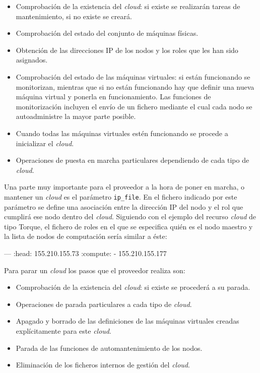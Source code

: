 \begin{itemize}
\item Comprobación de la existencia del \emph{cloud}: si existe se realizarán tareas de mantenimiento, si no existe se creará.
\item Comprobación del estado del conjunto de máquinas físicas.
\item Obtención de las direcciones IP de los nodos y los roles que les han sido asignados.
\item Comprobación del estado de las máquinas virtuales: si están funcionando se monitorizan, mientras que si no están funcionando hay que definir una nueva máquina virtual y ponerla en funcionamiento. Las funciones de monitorización incluyen el envío de un fichero mediante el cual cada nodo se autoadministre la mayor parte posible.
\item Cuando todas las máquinas virtuales estén funcionando se procede a inicializar el \emph{cloud}.
\item Operaciones de puesta en marcha particulares dependiendo de cada tipo de \emph{cloud}.
\end{itemize}

Una parte muy importante para el proveedor a la hora de poner en marcha, o mantener un \emph{cloud} es el parámetro \texttt{ip\_file}. En el fichero indicado por este parámetro se define una asociación entre la dirección IP del nodo y el rol que cumplirá ese nodo dentro del \emph{cloud}. Siguiendo con el ejemplo del recurso \emph{cloud} de tipo Torque, el fichero de roles en el que se especifica quién es el nodo maestro y la lista de nodos de computación sería similar a éste:

\begin{yamlcode}
--- 
:head: 155.210.155.73
:compute:
- 155.210.155.177
\end{yamlcode}

Para parar un \emph{cloud} los pasos que el proveedor realiza son:

\begin{itemize}
\item Comprobación de la existencia del \emph{cloud}: si existe se procederá a su parada.
\item Operaciones de parada particulares a cada tipo de \emph{cloud}.
\item Apagado y borrado de las definiciones de las máquinas virtuales creadas explícitamente para este \emph{cloud}.
\item Parada de las funciones de automantenimiento de los nodos.
\item Eliminación de los ficheros internos de gestión del \emph{cloud}.
\end{itemize}


